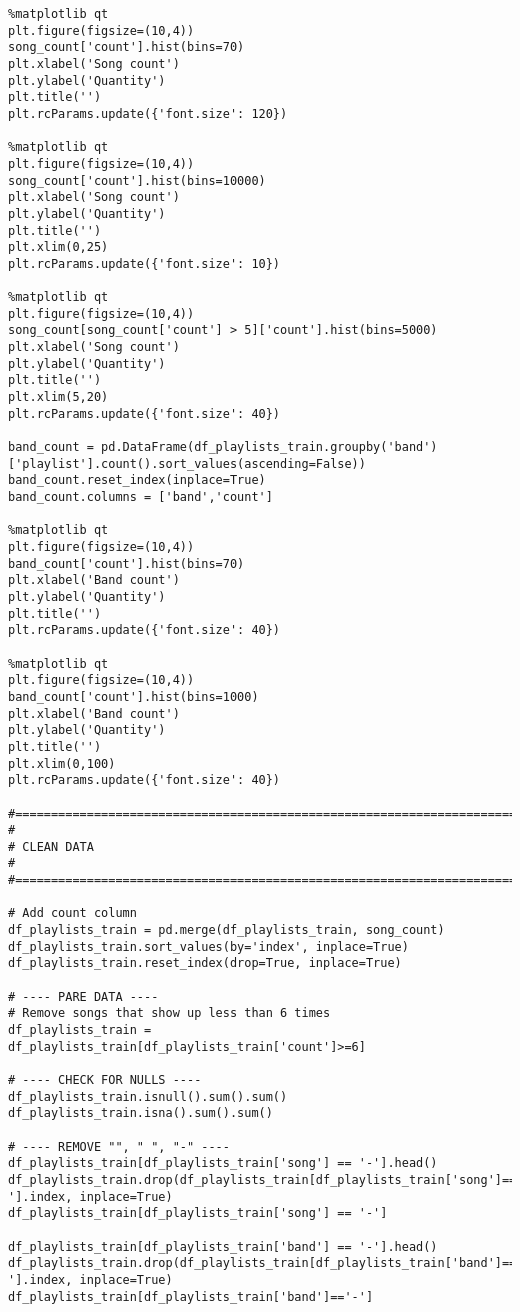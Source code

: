 \documentclass[11pt]{article}
\begin{document}
\begin{verbatim}
%matplotlib qt
plt.figure(figsize=(10,4))
song_count['count'].hist(bins=70)
plt.xlabel('Song count')
plt.ylabel('Quantity')
plt.title('')
plt.rcParams.update({'font.size': 120})

%matplotlib qt
plt.figure(figsize=(10,4))
song_count['count'].hist(bins=10000)
plt.xlabel('Song count')
plt.ylabel('Quantity')
plt.title('')
plt.xlim(0,25)
plt.rcParams.update({'font.size': 10})

%matplotlib qt
plt.figure(figsize=(10,4))
song_count[song_count['count'] > 5]['count'].hist(bins=5000)
plt.xlabel('Song count')
plt.ylabel('Quantity')
plt.title('')
plt.xlim(5,20)
plt.rcParams.update({'font.size': 40})

band_count = pd.DataFrame(df_playlists_train.groupby('band')['playlist'].count().sort_values(ascending=False))
band_count.reset_index(inplace=True)
band_count.columns = ['band','count']

%matplotlib qt
plt.figure(figsize=(10,4))
band_count['count'].hist(bins=70)
plt.xlabel('Band count')
plt.ylabel('Quantity')
plt.title('')
plt.rcParams.update({'font.size': 40})

%matplotlib qt
plt.figure(figsize=(10,4))
band_count['count'].hist(bins=1000)
plt.xlabel('Band count')
plt.ylabel('Quantity')
plt.title('')
plt.xlim(0,100)
plt.rcParams.update({'font.size': 40})

#==============================================================================
#
# CLEAN DATA
# 
#==============================================================================

# Add count column
df_playlists_train = pd.merge(df_playlists_train, song_count)
df_playlists_train.sort_values(by='index', inplace=True)
df_playlists_train.reset_index(drop=True, inplace=True)

# ---- PARE DATA ----
# Remove songs that show up less than 6 times
df_playlists_train = df_playlists_train[df_playlists_train['count']>=6]

# ---- CHECK FOR NULLS ----
df_playlists_train.isnull().sum().sum()
df_playlists_train.isna().sum().sum()

# ---- REMOVE "", " ", "-" ----
df_playlists_train[df_playlists_train['song'] == '-'].head()
df_playlists_train.drop(df_playlists_train[df_playlists_train['song']=='-'].index, inplace=True)
df_playlists_train[df_playlists_train['song'] == '-']

df_playlists_train[df_playlists_train['band'] == '-'].head()
df_playlists_train.drop(df_playlists_train[df_playlists_train['band']=='-'].index, inplace=True)
df_playlists_train[df_playlists_train['band']=='-']


\end{verbatim}
\end{document}
